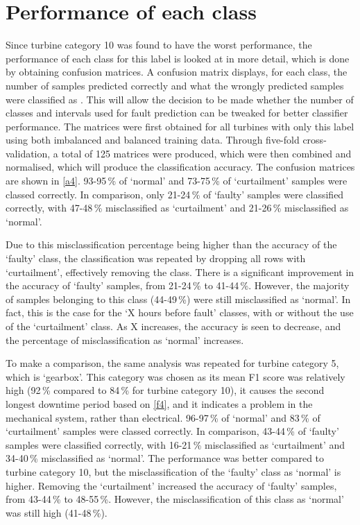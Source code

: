 \section{Performance of each class}

Since turbine category 10 was found to have the worst performance, the
performance of each class for this label is looked at in more detail, which is
done by obtaining confusion matrices. A confusion matrix displays, for each
class, the number of samples predicted correctly and what the wrongly
predicted samples were classified as \cite{33M}. This will allow the decision
to be made whether the number of classes and intervals used for fault
prediction can be tweaked for better classifier performance. The matrices were
first obtained for all turbines with only this label using both imbalanced and
balanced training data. Through five-fold cross-validation, a total of 125
matrices were produced, which were then combined and normalised, which will
produce the classification accuracy. The confusion matrices are shown in
\autoref{a4}. 93-95\,\% of `normal' and 73-75\,\% of `curtailment' samples
were classed correctly. In comparison, only 21-24\,\% of `faulty' samples were
classified correctly, with 47-48\,\% misclassified as `curtailment' and
21-26\,\% misclassified as `normal'.

Due to this misclassification percentage being higher than the accuracy of the
`faulty' class, the classification was repeated by dropping all rows with
`curtailment', effectively removing the class. There is a significant
improvement in the accuracy of `faulty' samples, from 21-24\,\% to 41-44\,\%.
However, the majority of samples belonging to this class (44-49\,\%) were
still misclassified as `normal'. In fact, this is the case for the `X hours
before fault' classes, with or without the use of the `curtailment' class. As
X increases, the accuracy is seen to decrease, and the percentage of
misclassification as `normal' increases.

To make a comparison, the same analysis was repeated for turbine category 5,
which is `gearbox'. This category was chosen as its mean F1 score was
relatively high (92\,\% compared to 84\,\% for turbine category 10), it causes
the second longest downtime period based on \autoref{f4}, and it indicates a
problem in the mechanical system, rather than electrical. 96-97\,\% of
`normal' and 83\,\% of `curtailment' samples were classed correctly. In
comparison, 43-44\,\% of `faulty' samples were classified correctly, with
16-21\,\% misclassified as `curtailment' and 34-40\,\% misclassified as
`normal'. The performance was better compared to turbine category 10, but the
misclassification of the `faulty' class as `normal' is higher. Removing the
`curtailment' increased the accuracy of `faulty' samples, from 43-44\,\% to
48-55\,\%. However, the misclassification of this class as `normal' was still
high (41-48\,\%).

